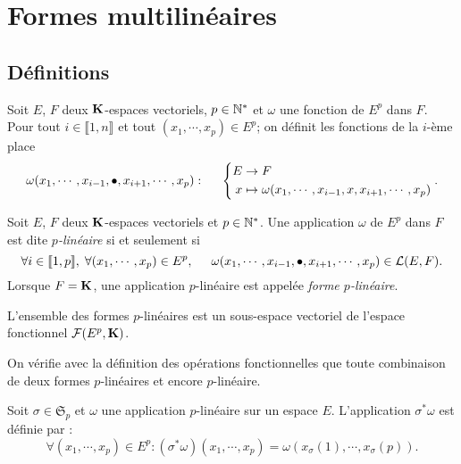 

\section{Formes multilinéaires}
\subsection{Définitions}
\begin{nota}
    Soit $E$, $F$ deux $\mathbf{K}$-espaces vectoriels, $p\in \mathbb{N}^*$ et $\omega$ une fonction de $E^p$ dans $F$.\newline
    Pour tout $i \in \llbracket 1,n \rrbracket$ et tout $(x_1, \cdots,x_p) \in E^p$; on définit les fonctions \og de la $i$-ème place\fg 
\[
  \omega(x_1, \cdots, x_{i-1}, \bullet , x_{i+1}, \cdots,x_p):\hspace{0.5cm}
\left\lbrace
\begin{aligned}
  E &\rightarrow F \\
  x &\mapsto \omega(x_1, \cdots, x_{i-1}, x , x_{i+1}, \cdots,x_p)
\end{aligned}
\right. .
\]
\end{nota}

\begin{defi}
  Soit $E$, $F$ deux $\mathbf{K}$-espaces vectoriels et $p\in \mathbb{N}^*$. Une application $\omega$ de $E^p$ dans $F$ est dite \emph{$p$-linéaire}  si et seulement si
\[
  \forall i \in \llbracket 1,p \rrbracket, \; \forall (x_1, \cdots, x_p) \in E^p, \hspace{0.5cm}
  \omega(x_1, \cdots, x_{i-1}, \bullet , x_{i+1}, \cdots,x_p) \in \mathcal{L}(E,F).
\]
Lorsque $F=\mathbf{K}$, une application $p$-linéaire est appelée \emph{forme $p$-linéaire}.
\end{defi}
\begin{propn}
L'ensemble des formes $p$-linéaires est un sous-espace vectoriel de l'espace fonctionnel $\mathcal F(E^p,\mathbf{K})$.  
\end{propn}
\begin{demo}
  On vérifie avec la définition des opérations fonctionnelles que toute combinaison de deux formes $p$-linéaires et encore $p$-linéaire. 
\end{demo}
\begin{defi}
Soit $\sigma\in \mathfrak S_p$ et $\omega$ une application $p$-linéaire sur un espace $E$. L'application $\sigma^*\omega$ est définie par :
\begin{displaymath}
 \forall (x_1,\cdots,x_p) \in E^p : (\sigma^*\omega)(x_1,\cdots,x_p)=\omega(x_\sigma(1),\cdots,x_\sigma(p)).
\end{displaymath}
\end{defi}

